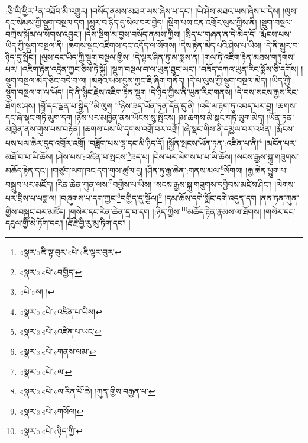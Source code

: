 :ཅི་ཡི་ཕྱིར་\footnote{«སྣར་»ཇི་ལྟ་བུར་«པེ་»ཇི་ལྟར་བུར་}ན་འཐོབ་མི་འགྱུར། །བསོད་ནམས་མཐའ་ཡས་ཞེས་པ་དང་། །ཡེ་ཤེས་མཐའ་ཡས་ཞེས་པ་དེས། །ལུས་དང་སེམས་ཀྱི་སྡུག་བསྔལ་དག །མྱུར་བ་ཉིད་དུ་སེལ་བར་བྱེད། །སྡིག་པས་ངན་འགྲོར་ལུས་ཀྱིས་ནི། །སྡུག་བསྔལ་བཀྲེས་སྐོམ་ལ་སོགས་འབྱུང་། །དེས་སྡིག་མ་བྱས་བསོད་ནམས་ཀྱིས། །སྲིད་པ་གཞན་ན་དེ་མེད་དོ། །རྨོངས་པས་ཡིད་ཀྱི་སྡུག་བསྔལ་ནི། །ཆགས་སྡང་འཇིགས་དང་འདོད་ལ་སོགས། །དེས་རྟེན་མེད་པའི་ཤེས་པ་ཡིས། །དེ་ནི་མྱུར་བ་ཉིད་དུ་སྤོང་། །ལུས་དང་ཡིད་ཀྱི་སྡུག་བསྔལ་གྱིས། །དེ་ལྟར་ཤིན་ཏུ་མ་སྨས་ན། །གལ་ཏེ་འཇིག་རྟེན་མཐས་གཏུགས་པར། །འཇིག་རྟེན་འདྲེན་ཀྱང་ཅིས་ཏེ་སྐྱོ། །སྡུག་བསྔལ་བ་ལ་ཡུན་ཐུང་ཡང་། །བཟོད་དཀའ་ཡུན་རིང་སྨོས་ཅི་དགོས། །སྡུག་བསྔལ་མེད་ཅིང་བདེ་བ་ལ། །མཐའ་ཡས་དུས་ཀྱང་ཇི་ཞིག་གནོད། །དེ་ལ་ལུས་ཀྱི་སྡུག་བསྔལ་མེད། །ཡིད་ཀྱི་སྡུག་བསྔལ་ག་ལ་ཡོད། །དེ་ནི་སྙིང་རྗེས་འཇིག་རྟེན་སྡུག །དེ་ཉིད་ཀྱིས་ནི་ཡུན་རིང་གནས། །དེ་བས་སངས་རྒྱས་རིང་ཐོགས་ཤས། །བློ་དང་ལྡན་པ་སྒྱིད་\footnote{«སྣར་»«པེ་»བགྱིད་}མི་ལུག །\footnote{«པེ་»ས། །}ཉེས་ཟད་ཡོན་ཏན་དོན་དུ་ནི། །འདི་ལ་རྟག་ཏུ་འབད་པར་བྱ། །ཆགས་དང་ཞེ་སྡང་གཏི་མུག་དག །ཉེས་པར་མཁྱེན་ནས་ཡོངས་སུ་སྤོངས། །མ་ཆགས་མི་སྡང་གཏི་མུག་མེད། །ཡོན་ཏན་མཁྱེན་ནས་གུས་པས་བརྟེན། །ཆགས་པས་ཡི་དྭགས་འགྲོ་བར་འགྲོ། །ཞེ་སྡང་གིས་ནི་དམྱལ་བར་འཕེན། །རྨོངས་པས་ཕལ་ཆེར་དུད་འགྲོར་འགྲོ། །བཟློག་པས་ལྷ་དང་མི་ཉིད་དོ། །སྐྱོན་སྤངས་ཡོན་ཏན་:འཛིན་པ་ནི།\footnote{«སྣར་»«པེ་»འཛིན་པ་ཡིས།} །མངོན་པར་མཐོ་བ་པ་ཡི་ཆོས། །ཤེས་པས་:འཛིན་པ་སྤངས་\footnote{«སྣར་»«པེ་»འཛིན་པ་ཡང་}ཟད་པ། །ངེས་པར་ལེགས་པ་པ་ཡི་ཆོས། །སངས་རྒྱས་སྐུ་གཟུགས་མཆོད་རྟེན་དང་། །གཙུག་ལག་ཁང་དག་གུས་ཚུལ་དུ། །ཤིན་ཏུ་རྒྱ་ཆེན་:གནས་མལ་\footnote{«སྣར་»«པེ་»གནས་ལམ་}སོགས། །རྒྱ་ཆེན་ཕྱུག་པ་བསྒྲུབ་པར་མཛོད། །རིན་ཆེན་ཀུན་ལས་\footnote{«སྣར་»«པེ་»ལ་}བགྱིས་པ་ཡིས། །སངས་རྒྱས་སྐུ་གཟུགས་དབྱིབས་མཛེས་ཤིང་། །ལེགས་པར་བྲིས་པ་པདྨ་ལ། །བཞུགས་པ་དག་ཀྱང་\footnote{«སྣར་»«པེ་»ལ་རིན་པོ་ཆེ། །ཀུན་གྱིས་བརྒྱན་པ་}བགྱིད་དུ་སྩོལ།\footnote{«སྣར་»«པེ་»གསོལ།} །དམ་ཆོས་དགེ་སློང་དགེ་འདུན་དག །ནན་ཏན་ཀུན་གྱིས་བསྐྱང་བར་མཛོད། །གསེར་དང་རིན་ཆེན་དྲ་བ་དག །:ཉིད་ཀྱིས་\footnote{«སྣར་»«པེ་»ཉིད་ཀྱི་}མཆོད་རྟེན་རྣམས་ལ་ཐོགས། །གསེར་དང་དངུལ་གྱི་མེ་ཏོག་དང་། །རྡོ་རྗེ་བྱི་རུ་མུ་ཏིག་དང་། །
